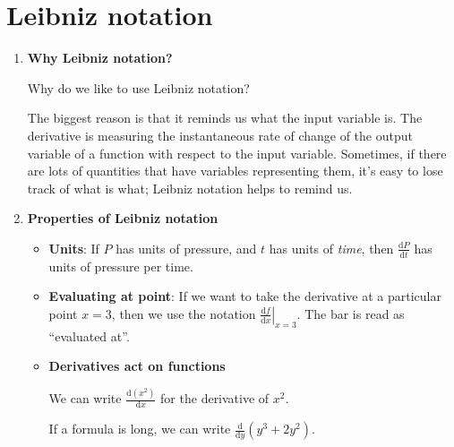 \section{Leibniz notation}
\begin{enumerate}
    \item \textbf{Why Leibniz notation?}

        Why do we like to use Leibniz notation?

        The biggest reason is that it reminds us what the input variable is. The derivative is measuring the instantaneous rate of change of the output variable of a function with respect to the input variable. Sometimes, if there are lots of quantities that have variables representing them, it's easy to lose track of what is what; Leibniz notation helps to remind us.
    \item \textbf{Properties of Leibniz notation}
        \begin{itemize}
            \item \textbf{Units}: If $P$ has units of pressure, and $t$ has units of \textit{time}, then $\frac{\mathrm{d}P}{\mathrm{d}t}$ has units of pressure per time.
            \item \textbf{Evaluating at point}: If we want to take the derivative at a particular point $x=3$, then we use the notation $\left.\frac{\mathrm{d}f}{\mathrm{d}x}\right|_{x=3}$. The bar is read as ``evaluated at''.
            \item \textbf{Derivatives act on functions}
                
                We can write $\frac{\mathrm{d}(x^2)}{\mathrm{d}x}$ for the derivative of $x^2$.

                If a formula is long, we can write $\frac{\mathrm{d}}{\mathrm{d}y}(y^3+2y^2)$.
        \end{itemize}
\end{enumerate}

